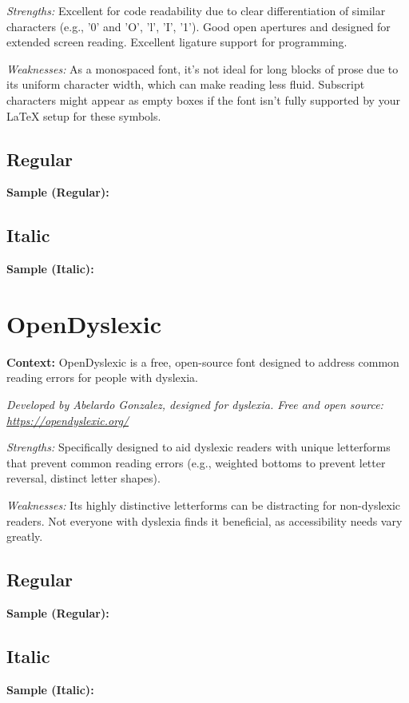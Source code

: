 \begin{raggedright}
	\emph{Strengths:} Excellent for code readability due to clear differentiation of similar characters (e.g., '0' and 'O', 'l', 'I', '1'). Good open apertures and designed for extended screen reading. Excellent ligature support for programming.

	\emph{Weaknesses:} As a monospaced font, it's not ideal for long blocks of prose due to its uniform character width, which can make reading less fluid. Subscript characters might appear as empty boxes if the font isn't fully supported by your LaTeX setup for these symbols.

	\subsection{Regular}
	\noindent\textbf{Sample (Regular):}
	\FontSample{\jetbrainsmonofont}

	\subsection{Italic}
	\noindent\textbf{Sample (Italic):}
	\FontSample{{\jetbrainsmonofont\itshape}}
\end{raggedright}




\pagebreak
\section{OpenDyslexic}\label{app5:sec:opendyslexic}
\noindent
\textbf{Context:} OpenDyslexic is a free, open-source font designed to address common reading errors for people with dyslexia.

\emph{Developed by Abelardo Gonzalez, designed for dyslexia. Free and open source: \url{https://opendyslexic.org/}}
\begin{raggedright}
	\emph{Strengths:} Specifically designed to aid dyslexic readers with unique letterforms that prevent common reading errors (e.g., weighted bottoms to prevent letter reversal, distinct letter shapes).

	\emph{Weaknesses:} Its highly distinctive letterforms can be distracting for non-dyslexic readers. Not everyone with dyslexia finds it beneficial, as accessibility needs vary greatly.

	\subsection{Regular}
	\noindent\textbf{Sample (Regular):}
	\FontSample{\opendyslexicfont}

	\subsection{Italic}
	\noindent\textbf{Sample (Italic):}
	\FontSample{{\opendyslexicfont\itshape}}
\end{raggedright}


